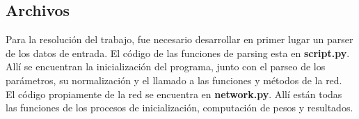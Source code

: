 









\subsection{Archivos}
Para la resolución del trabajo, fue necesario desarrollar en primer lugar un parser de los datos de entrada. El código de las funciones de parsing esta en \textbf{script.py}. Allí se encuentran la inicialización del programa, junto con el parseo de los parámetros, su normalización y el llamado a las funciones y métodos de la red.\\

El código propiamente de la red se encuentra en \textbf{network.py}. Allí están todas las funciones de los procesos de inicialización, computación de pesos y resultados.\\



